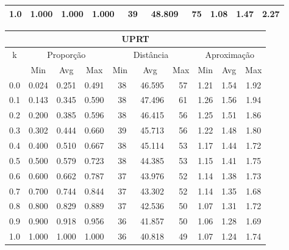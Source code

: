 \begin{table}[!tbh]
\begin{center}
{\begin{tabular}{|c|c|c|c|c|c|c|c|c|c|}
1.0                & 1.000     & 1.000    & 1.000    & ~39      & ~48.809  & ~75     & 1.08    & 1.47  & 2.27             \\ \hline
\end{tabular}%
\vspace{5pt}
\begin{tabular}{|c|c|c|c|c|c|c|c|c|c|}
\hline
\multicolumn{10}{|c|}{\bf UPRT}                                                                                           \\ \hline
\multirow{2}{*}{k} & \multicolumn{3}{c|}{Proporção}  & \multicolumn{3}{c|}{Distância} & \multicolumn{3}{c|}{Aproximação}  \\ \cline{2-10}
                   & Min       & Avg      & Max      & Min      & Avg      & Max     & Min     & Avg   & Max              \\ \hline
0.0                & 0.024     & 0.251    & 0.491    & ~38      & ~46.595  & ~57     & 1.21    & 1.54  & 1.92             \\ \hline
0.1                & 0.143     & 0.345    & 0.590    & ~38      & ~47.496  & ~61     & 1.26    & 1.56  & 1.94             \\ \hline
0.2                & 0.200     & 0.385    & 0.596    & ~38      & ~46.415  & ~56     & 1.25    & 1.51  & 1.86             \\ \hline
0.3                & 0.302     & 0.444    & 0.660    & ~39      & ~45.713  & ~56     & 1.22    & 1.48  & 1.80             \\ \hline
0.4                & 0.400     & 0.510    & 0.667    & ~38      & ~45.114  & ~53     & 1.17    & 1.44  & 1.72             \\ \hline
0.5                & 0.500     & 0.579    & 0.723    & ~38      & ~44.385  & ~53     & 1.15    & 1.41  & 1.75             \\ \hline
0.6                & 0.600     & 0.662    & 0.787    & ~37      & ~43.976  & ~52     & 1.14    & 1.38  & 1.73             \\ \hline
0.7                & 0.700     & 0.744    & 0.844    & ~37      & ~43.302  & ~52     & 1.14    & 1.35  & 1.68             \\ \hline
0.8                & 0.800     & 0.829    & 0.889    & ~37      & ~42.536  & ~50     & 1.07    & 1.31  & 1.72             \\ \hline
0.9                & 0.900     & 0.918    & 0.956    & ~36      & ~41.857  & ~50     & 1.06    & 1.28  & 1.69             \\ \hline
1.0                & 1.000     & 1.000    & 1.000    & ~36      & ~40.818  & ~49     & 1.07    & 1.24  & 1.74             \\ \hline
\end{tabular}%
}
\end{center}
\end{table}
